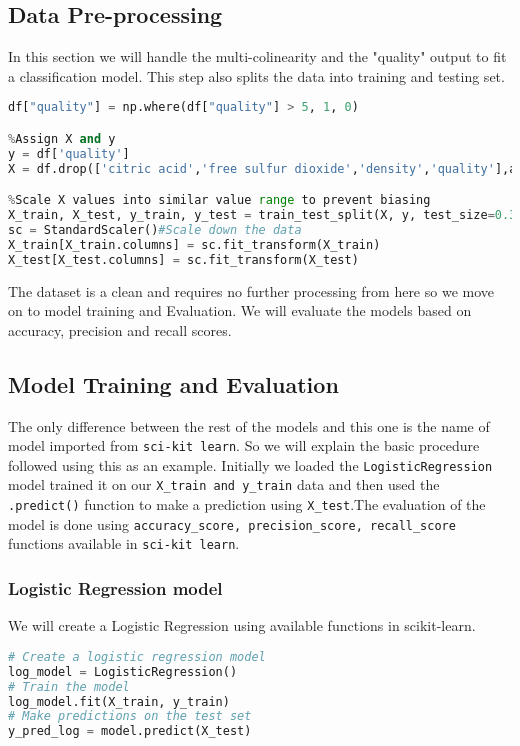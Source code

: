 \documentclass{article}
\begin{document}
\subsection{Data Pre-processing}
In this section we will handle the multi-colinearity and the "quality" output to fit a classification model. This step also splits the data into training and testing set.
\begin{lstlisting}[language=Python]
%Change the quality column to 0,i.e, bad wine and 1,i.e,good wine.
df["quality"] = np.where(df["quality"] > 5, 1, 0)

%Assign X and y
y = df['quality']
X = df.drop(['citric acid','free sulfur dioxide','density','quality'],axis = 1)

%Scale X values into similar value range to prevent biasing
X_train, X_test, y_train, y_test = train_test_split(X, y, test_size=0.3, random_state=23)
sc = StandardScaler()#Scale down the data
X_train[X_train.columns] = sc.fit_transform(X_train)
X_test[X_test.columns] = sc.fit_transform(X_test)
\end{lstlisting}
The dataset is a clean and requires no further processing from here so we move on to model training and Evaluation.
We will evaluate the models based on accuracy, precision and recall scores.
\subsection{Model Training and Evaluation}
The only difference between the rest of the models and this one is the name of model imported from \verb|sci-kit learn|. So we will explain the basic procedure followed using this as an example. Initially we loaded the \verb|LogisticRegression| model trained it on our \verb|X_train and y_train| data and then used the \verb|.predict()| function to make a prediction using \verb|X_test|.The evaluation of the model is done using \verb|accuracy_score, precision_score, recall_score| functions available in \verb|sci-kit learn|.\\
\subsubsection{Logistic Regression model}
We will create a Logistic Regression using available functions in scikit-learn. 
\begin{lstlisting}[language=Python, caption=Creating models]
 # Create a logistic regression model
log_model = LogisticRegression()
# Train the model
log_model.fit(X_train, y_train)
# Make predictions on the test set
y_pred_log = model.predict(X_test)
\end{lstlisting}
\end{document}
